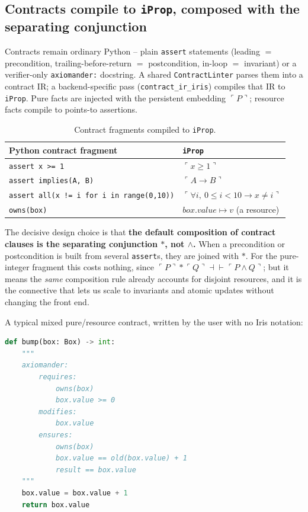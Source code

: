 \documentclass[sigconf,nonacm]{acmart}
\newcommand{\sepc}{\mathbin{\ast}}
\newcommand{\pto}{\mapsto}
\newcommand{\pure}[1]{\ulcorner #1 \urcorner}
\newcommand{\code}[1]{\texttt{#1}}
\begin{document}
\subsection{Contracts compile to \code{iProp}, composed with the separating
conjunction}

Contracts remain ordinary Python -- plain \code{assert} statements (leading $=$
precondition, trailing-before-return $=$ postcondition, in-loop $=$ invariant) or
a verifier-only \code{axiomander:} docstring. A shared \code{ContractLinter}
parses them into a contract IR; a backend-specific pass (\code{contract\_ir\_iris})
compiles that IR to \code{iProp}. Pure facts are injected with the persistent
embedding $\pure{P}$; resource facts compile to points-to assertions.

\begin{table}[t]
\caption{Contract fragments compiled to \code{iProp}.}
\label{tab:compile}
\small
\begin{tabular}{@{}ll@{}}
\toprule
Python contract fragment & \code{iProp} \\
\midrule
\code{assert x >= 1} & $\pure{x \ge 1}$ \\
\code{assert implies(A, B)} & $\pure{A \to B}$ \\
\code{assert all(x != i for i in range(0,10))} &
  $\pure{\forall i,\ 0 \le i < 10 \to x \ne i}$ \\
\code{owns(box)} & $\textit{box.value} \pto v$ (a resource) \\
\bottomrule
\end{tabular}
\end{table}

The decisive design choice is that \textbf{the default composition of contract
clauses is the separating conjunction $\sepc$, not $\wedge$.} When a precondition
or postcondition is built from several \code{assert}s, they are joined with
$\sepc$. For the pure-integer fragment this costs nothing, since
$\pure{P} \sepc \pure{Q} \dashv\vdash \pure{P \wedge Q}$; but it means the
\emph{same} composition rule already accounts for disjoint resources, and it is
the connective that lets us scale to invariants and atomic updates without
changing the front end.

A typical mixed pure/resource contract, written by the user with no Iris
notation:

\begin{lstlisting}[language=Python]
def bump(box: Box) -> int:
    """
    axiomander:
        requires:
            owns(box)
            box.value >= 0
        modifies:
            box.value
        ensures:
            owns(box)
            box.value == old(box.value) + 1
            result == box.value
    """
    box.value = box.value + 1
    return box.value
\end{lstlisting}
\end{document}
